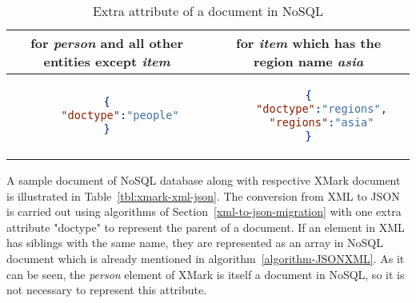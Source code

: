 \begin{longtable}{c|c}
	\caption{ Extra attribute of a document in NoSQL}
	\label{tbl:xmark-item-type}\\
    {for \textit{person} and all other entities except \textit{item} } & {for \textit{item} which has the region name \textit{asia}}\\
	\hline
\begin{minipage}{.4\textwidth}
\begin{lstlisting}[language=JSON]
{
	"doctype":"people"
}
\end{lstlisting}
\end{minipage} &
\begin{minipage}{.4\textwidth}
\begin{lstlisting}[language=JSON]
{
	"doctype":"regions",
	"regions":"asia"
}
\end{lstlisting}
\end{minipage}
\end{longtable}

A sample document of NoSQL database along with respective XMark document is illustrated in  Table~\ref{tbl:xmark-xml-json}. The conversion from XML to JSON is carried out using algorithms of Section~\ref{xml-to-json-migration} with one extra attribute "doctype" to represent the parent of a document. If an element in XML has siblings with the same name, they are represented as an array in NoSQL document which is already mentioned in algorithm~\ref{algorithm-JSONXML}. As it can be seen, the \textit{person} element of XMark is itself a document in NoSQL, so it is not necessary to represent this attribute.  

